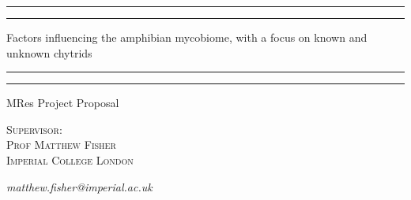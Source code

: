 \documentclass[11pt, a4paper, titlepage]{article}
\begin{document}
\linenumbers
\begin{titlepage} %
	
	\centering %
	
	\scshape %
	
	\vspace*{\baselineskip} %
	
	
	
	
	\rule{\textwidth}{1.6pt}\vspace*{-\baselineskip}\vspace*{2pt} %
	
	\rule{\textwidth}{0.4pt} %
	
	\vspace{0.75\baselineskip} %
	
	{\LARGE Factors influencing the amphibian mycobiome, with a focus on known and unknown chytrids \\} %
	
	\vspace{0.75\baselineskip} %

	\rule{\textwidth}{0.4pt}\vspace*{-\baselineskip}\vspace{3.2pt} %
	
	\rule{\textwidth}{1.6pt} %
	
	\vspace{2\baselineskip} %
	
	
	
	
	MRes Project Proposal %
	
	\vspace*{3\baselineskip} %
	
	
	
	
	\vspace{0.5\baselineskip} %
	
	{\scshape\Large Supervisor:\\
		Prof Matthew Fisher \\
		Imperial College London\\} %
	
	\textit{matthew.fisher@imperial.ac.uk}

\end{titlepage}
\end{document}
